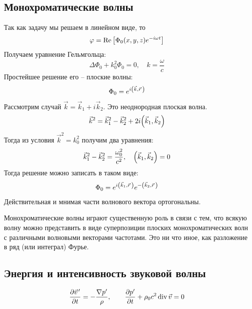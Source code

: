 \subsection{Монохроматические волны}
Так как задачу мы решаем в линейном виде, то 
\begin{equation}
    \varphi = \Re\qty[\Phi_0(x,y,z)e^{-i\omega t}]
\end{equation}
Получаем уравнение Гельмгольца:
\begin{equation}
    \Delta \Phi_0+k_0^2 \Phi_0 = 0,\quad k=\frac{\omega}{c}
\end{equation}
Простейшее решение его -- плоские волны:
\begin{equation}
    \Phi_0 = e^{i\qty(\vec{k}, \vec{r}\,)}
\end{equation}
Рассмотрим случай $\vec{k} = \vec{k}_1 + i\vec{k}_2$. Это неоднородная плоская волна.
\begin{equation}
    \vec{k}^2 = \vec{k}_1^2 - \vec{k}_2^2 +2i \qty(\vec{k}_1,\vec{k}_2)
\end{equation}
Тогда из условия $\vec{k}^2 = k_0^2$ получим два уравнения:
\begin{equation}
    \vec{k}_1^2-\vec{k}_2^2 = \frac{\omega_0^2}{c^2}, \quad
    \qty(\vec{k}_1,\vec{k}_2)=0
\end{equation}
Тогда решение можно записать в таком виде:
\begin{equation}
    \Phi_0 = e^{i\qty(\vec{k}_1, \vec{r}\,)}e^{-\qty(\vec{k}_2,\vec{r}\,)}
\end{equation}
Действительная и мнимая части волнового вектора ортогональны. 

Монохроматические волны играют существенную роль в связи с тем, что всякую волну можно представить в виде суперпозиции плоских монохроматических волн с различными волновыми векторами частотами. Это ни что иное, как разложение в ряд (или интеграл) Фурье.\footnotemark



\subsection{Энергия и интенсивность звуковой волны}

\begin{equation}
    \pdv{\pvec{v}'}{t} = -\frac{\nabla p'}{\rho}, \qquad
    \pdv{p'}{t} +\rho_0 c^2 \Div \vec{v} = 0
\end{equation}

